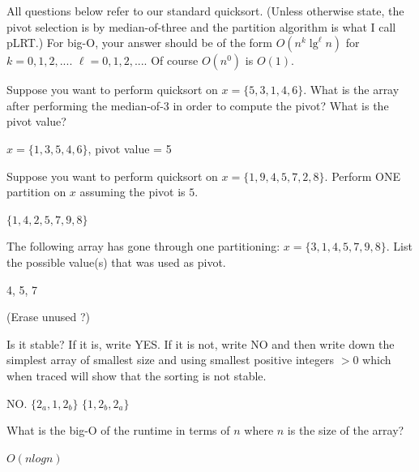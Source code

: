 

All questions below refer to our standard quicksort.
(Unless otherwise state, the pivot selection is by median-of-three
and the partition algorithm is what I call pLRT.)
For big-O,
your answer should be of the form $O(n^k \lg^\ell n)$ for
$k=0, 1, 2, ...$.
$\ell=0, 1, 2, ...$.
Of course $O(n^0)$ is $O(1)$.

\nextq
Suppose you want to perform quicksort on
$x = \{ 5, 3, 1, 4, 6 \}$.
What is the array after performing the median-of-3 in order to
compute the pivot? What is the pivot value?
\\
\ANSWER
\begin{answerlong}
$x = \{ 1, 3, 5, 4, 6 \}$, pivot value = 5
\end{answerlong}

\nextq
Suppose you want to perform quicksort on
$x = \{ 1, 9, 4, 5, 7, 2, 8 \}$.
Perform ONE partition on $x$ assuming the pivot is $5$.
\\
\ANSWER
\begin{answerlong}
$\{ 1, 4, 2, 5, 7, 9, 8 \}$
\end{answerlong}

\nextq
The following array has gone through one partitioning:
$x = \{ 3, 1, 4, 5, 7, 9, 8 \}$.
List the possible value(s) that was used as pivot.
\\
\ANSWER
\begin{answerlong}
4, 5, 7
\end{answerlong}
(Erase unused ?)

\nextq
Is it stable?
If it is, write YES.
If it is not, write NO and then write down
the simplest array
of smallest size and using smallest positive integers $> 0$
which when traced will show that the sorting is not stable.
\\
\ANSWER
\begin{answerlong}
NO. $\{ 2_a, 1, 2_b\}$
    $\{ 1, 2_b, 2_a\}$
\end{answerlong}

\nextq
What is the big-O of the runtime
in terms of $n$ where $n$ is the size of the array?
\\
\ANSWER
\begin{answerlong}
$O(nlogn)$
\end{answerlong}

